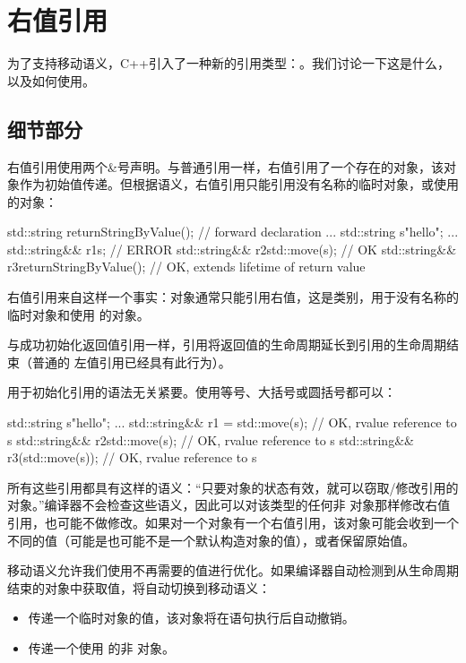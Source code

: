 \section{右值引用}

为了支持移动语义，C++引入了一种新的引用类型：。我们讨论一下这是什么，以及如何使用。

\subsection{细节部分}

右值引用使用两个\&号声明。与普通引用一样，右值引用了一个存在的对象，该对象作为初始值传递。但根据语义，右值引用只能引用没有名称的临时对象，或使用  的对象：

\begin{cppcode}
std::string returnStringByValue(); // forward declaration
...
std::string s{"hello"};
...
std::string&& r1{s}; // ERROR
std::string&& r2{std::move(s)}; // OK
std::string&& r3{returnStringByValue()}; // OK, extends lifetime of return value
\end{cppcode}

右值引用来自这样一个事实：对象通常只能引用右值，这是类别，用于没有名称的临时对象和使用  的对象。

与成功初始化返回值引用一样，引用将返回值的生命周期延长到引用的生命周期结束（普通的  左值引用已经具有此行为）。

用于初始化引用的语法无关紧要。使用等号、大括号或圆括号都可以：

\begin{cppcode}
std::string s{"hello"};
...
std::string&& r1 = std::move(s); // OK, rvalue reference to s
std::string&& r2{std::move(s)}; // OK, rvalue reference to s
std::string&& r3(std::move(s)); // OK, rvalue reference to s
\end{cppcode}

所有这些引用都具有这样的语义：“只要对象的状态有效，就可以窃取/修改引用的对象。”编译器不会检查这些语义，因此可以对该类型的任何非  对象那样修改右值引用，也可能不做修改。如果对一个对象有一个右值引用，该对象可能会收到一个不同的值（可能是也可能不是一个默认构造对象的值），或者保留原始值。

移动语义允许我们使用不再需要的值进行优化。如果编译器自动检测到从生命周期结束的对象中获取值，将自动切换到移动语义：

\begin{itemize}
	\item 传递一个临时对象的值，该对象将在语句执行后自动撤销。
	\item 传递一个使用  的非  对象。
\end{itemize}

